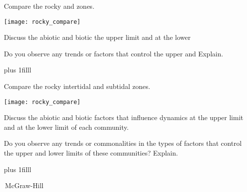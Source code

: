 \documentclass[t]{beamer}
\begin{document}
\begin{frame}[t]{Compare the rocky \raisebox{1ex}{\scalebox{1}[-1]{intertidal}} and \raisebox{1ex}{\scalebox{1}[-1]{subtidal}} zones.} 

\vspace*{-\baselineskip}

\begin{multicols}{2}
	
	\vspace*{-\baselineskip}
	\begin{center}
		\texttt{[image: rocky\_compare]}
	\end{center}
	
	\columnbreak
	
	\hangpara Discuss the abiotic and biotic  the upper limit and at the lower 
	
	
	\hangpara Do you observe any trends or  factors that control the upper and  Explain.
	
\end{multicols}

\vskip0pt plus 1filll

\hfill \tiny\raisebox{\depth}{\scalebox{-1}[-1]{\textcopyright\,McGraw-Hill}}

\end{frame}




\begin{frame}[t]{Compare the rocky intertidal and subtidal zones.}

\vspace*{-\baselineskip}

\begin{multicols}{2}

	\vspace*{-\baselineskip}
	\begin{center}
		\texttt{[image: rocky\_compare]}
	\end{center}

\columnbreak

	\hangpara Discuss the abiotic and biotic factors that influence dynamics at the upper limit and at the lower limit of each community. 
	

	\hangpara Do you observe any trends or commonalities in the types of factors that control the upper and lower limits of these communities? Explain.

\end{multicols}

	\vskip0pt plus 1filll

	\tiny\textcopyright\,McGraw-Hill

\end{frame}
\end{document}
